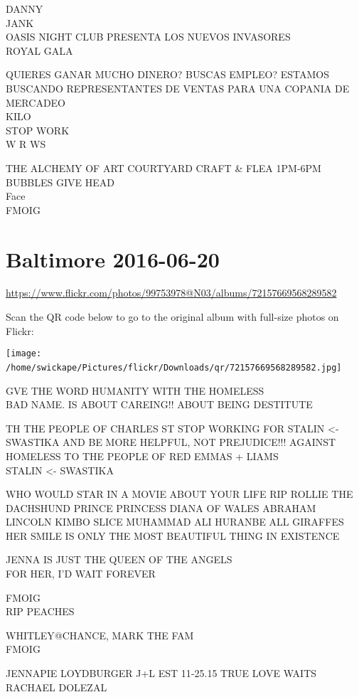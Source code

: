 \documentclass[10pt,letterpaper]{article}
\begin{document}
DANNY\\
JANK\\
OASIS NIGHT CLUB PRESENTA LOS NUEVOS INVASORES\\
ROYAL GALA

QUIERES GANAR MUCHO DINERO?  BUSCAS EMPLEO?  ESTAMOS BUSCANDO REPRESENTANTES DE VENTAS PARA UNA COPANIA DE MERCADEO\\
KILO\\
STOP WORK\\
W R WS

THE ALCHEMY OF ART COURTYARD CRAFT \& FLEA 1PM{-}6PM\\
BUBBLES GIVE HEAD\\
Face\\
FMOIG
\

\section*{Baltimore 2016-06-20}

\url{https://www.flickr.com/photos/99753978@N03/albums/72157669568289582}

Scan the QR code below to go to the original album with full-size photos on Flickr:

\texttt{[image: /home/swickape/Pictures/flickr/Downloads/qr/72157669568289582.jpg]}
\

GVE THE WORD HUMANITY WITH THE HOMELESS\\
BAD NAME.  IS ABOUT CAREING!! ABOUT BEING DESTITUTE

TH THE PEOPLE OF CHARLES ST STOP WORKING FOR STALIN <{-} SWASTIKA AND BE MORE HELPFUL, NOT PREJUDICE!!! AGAINST HOMELESS TO THE PEOPLE OF RED EMMAS + LIAMS\\
STALIN <{-} SWASTIKA

WHO WOULD STAR IN A MOVIE ABOUT YOUR LIFE RIP ROLLIE THE DACHSHUND PRINCE PRINCESS DIANA OF WALES ABRAHAM LINCOLN KIMBO SLICE MUHAMMAD ALI HURANBE ALL GIRAFFES\\
HER SMILE IS ONLY THE MOST BEAUTIFUL THING IN  EXISTENCE

JENNA IS JUST THE QUEEN OF THE ANGELS\\
FOR HER, I'D WAIT FOREVER

FMOIG\\
RIP PEACHES

WHITLEY@CHANCE, MARK THE FAM\\
FMOIG

JENNAPIE LOYDBURGER J+L EST 11{-}25.15 TRUE LOVE WAITS\\
RACHAEL DOLEZAL
\end{document}
